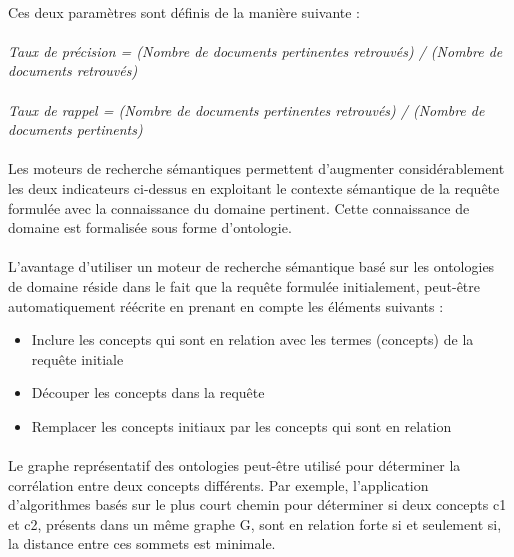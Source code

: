 \documentclass[12pt, a4paper, oneside]{book}
\begin{document}
\paragraph{}
Ces deux paramètres sont définis de la manière suivante : 

\paragraph{}

\emph{Taux de précision = (Nombre de documents pertinentes retrouvés) / (Nombre de documents retrouvés)
}
\paragraph{}

\emph{Taux de rappel = (Nombre de documents pertinentes retrouvés) / (Nombre de documents pertinents)
}
\paragraph{}
Les moteurs de recherche sémantiques permettent d'augmenter considérablement les deux indicateurs ci-dessus en exploitant le contexte sémantique de la requête formulée avec la connaissance du domaine pertinent.
Cette connaissance de domaine est formalisée sous forme d'ontologie.

\paragraph{}
L'avantage d'utiliser un moteur de recherche sémantique basé sur les ontologies de domaine réside dans le fait que la requête formulée initialement, peut-être automatiquement réécrite en prenant en compte les éléments suivants \citep{avantage} : 

\begin{itemize}
\item Inclure les concepts qui sont en relation avec les termes (concepts) de la requête initiale
\item Découper les concepts dans la requête
\item Remplacer les concepts initiaux par les concepts qui sont en relation
\end{itemize}

\paragraph{}
Le graphe représentatif des ontologies peut-être utilisé pour déterminer la corrélation entre deux concepts différents. Par exemple, l'application d'algorithmes basés sur le plus court chemin pour déterminer si deux concepts c1 et c2, présents dans un même graphe G, sont en relation forte si et seulement si, la distance entre ces sommets est minimale.
\end{document}

